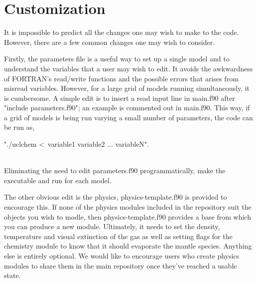 \documentclass{llncs}
\begin{document}
\section{Customization}
\label{sec:alter}
It is impossible to predict all the changes one may wish to make to the code. However, there are a few common changes one may wish to consider.\par
Firstly, the parameters file is a useful way to set up a single model and to understand the variables that a user may wish to edit. It avoids the awkwardness of FORTRAN's read/write functions and the possible errors that arises from misread variables. However, for a large grid of models running simultaneously, it is cumbersome. A simple edit is to insert a read input line in main.f90 after "include parameters.f90"; an example is commented out in main.f90. This way, if a grid of models is being run varying a small number of parameters, the code can be run as,\\
 \centerline{"./uclchem \textless ~variable1 variable2 ... variableN".}\\
Eliminating the need to edit parameters.f90 programmatically, make the executable and run for each model.\par
The other obvious edit is the physics, physics-template.f90 is provided to encourage this. If none of the physics modules included in the repository suit the objects you wish to modle, then physics-template.f90 provides a base from which you can produce a new module. Ultimately, it needs to set the density, temperature and visual extinction of the gas as well as setting flags for the chemistry module to know that it should evaporate the mantle species. Anything else is entirely optional. We would like to encourage users who create physics modules to share them in the main repository once they've reached a usable state.
 


\end{document}
